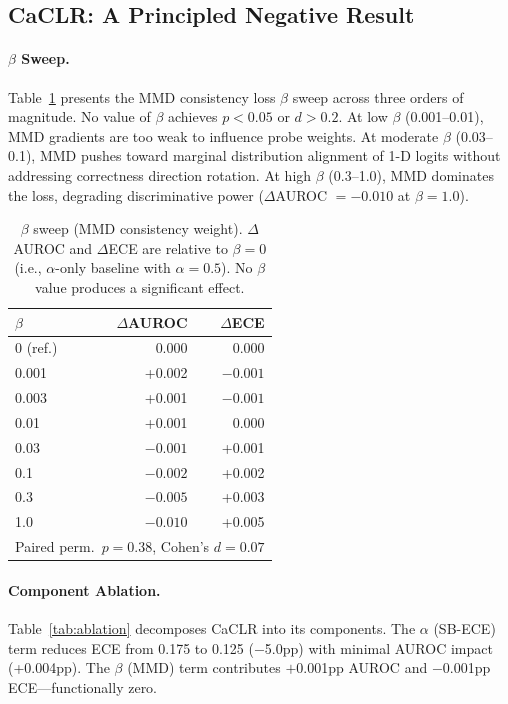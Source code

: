 \documentclass[11pt,a4paper]{article}
\begin{document}
\subsection{CaCLR: A Principled Negative Result}
\label{sec:caclr}

\paragraph{$\beta$ Sweep.}
Table~\ref{tab:beta_sweep} presents the MMD consistency loss $\beta$ sweep across three orders of magnitude.
No value of $\beta$ achieves $p < 0.05$ or $d > 0.2$.
At low $\beta$ (0.001--0.01), MMD gradients are too weak to influence probe weights.
At moderate $\beta$ (0.03--0.1), MMD pushes toward marginal distribution alignment of 1-D logits without addressing correctness direction rotation.
At high $\beta$ (0.3--1.0), MMD dominates the loss, degrading discriminative power ($\Delta$AUROC $= -0.010$ at $\beta = 1.0$).

\begin{table}[t]
\centering
\small
\begin{tabular}{lrr}
\toprule
$\beta$ & $\Delta$AUROC & $\Delta$ECE \\
\midrule
\rowcolor{lightgray}
0 (ref.) & 0.000 & 0.000 \\
0.001 & +0.002 & $-0.001$ \\
0.003 & +0.001 & $-0.001$ \\
0.01 & +0.001 & 0.000 \\
0.03 & $-0.001$ & +0.001 \\
0.1 & $-0.002$ & +0.002 \\
0.3 & $-0.005$ & +0.003 \\
1.0 & $-0.010$ & +0.005 \\
\midrule
\multicolumn{3}{l}{\small Paired perm.\ $p = 0.38$, Cohen's $d = 0.07$} \\
\bottomrule
\end{tabular}
\caption{$\beta$ sweep (MMD consistency weight). $\Delta$AUROC and $\Delta$ECE are relative to $\beta = 0$ (i.e., $\alpha$-only baseline with $\alpha = 0.5$). No $\beta$ value produces a significant effect.}
\label{tab:beta_sweep}
\end{table}

\paragraph{Component Ablation.}
Table~\ref{tab:ablation} decomposes CaCLR into its components.
The $\alpha$ (SB-ECE) term reduces ECE from 0.175 to 0.125 ($-$5.0pp) with minimal AUROC impact (+0.004pp).
The $\beta$ (MMD) term contributes $+$0.001pp AUROC and $-$0.001pp ECE---functionally zero.
\end{document}

